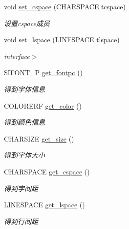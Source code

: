 \begin{DoxyCompactItemize}
void \hyperlink{class_s_i_c_h_a_r___i_n_f_o_a18aaf35f07094cb42942663a71456227}{set\+\_\+cspace} (C\+H\+A\+R\+S\+P\+A\+CE tcspace)
\begin{DoxyCompactList}\small\item\em 设置cspace成员 \end{DoxyCompactList}\item 
void \hyperlink{class_s_i_c_h_a_r___i_n_f_o_af38e1eac74e8d9c14e5c5d05d58f8b36}{set\+\_\+lspace} (L\+I\+N\+E\+S\+P\+A\+CE tlspace)
\begin{DoxyCompactList}\small\item\em interface$>$ \end{DoxyCompactList}\item 
S\+I\+F\+O\+N\+T\+\_\+P \hyperlink{class_s_i_c_h_a_r___i_n_f_o_ad53aa1c6641e81bf0b79f17836aa5dfa}{get\+\_\+fontpc} ()
\begin{DoxyCompactList}\small\item\em 得到字体信息~\newline
\end{DoxyCompactList}\item 
C\+O\+L\+O\+R\+E\+RF \hyperlink{class_s_i_c_h_a_r___i_n_f_o_acd6d47c6cf5f266e18033e45763d6272}{get\+\_\+color} ()
\begin{DoxyCompactList}\small\item\em 得到颜色信息~\newline
\end{DoxyCompactList}\item 
C\+H\+A\+R\+S\+I\+ZE \hyperlink{class_s_i_c_h_a_r___i_n_f_o_aae2cfbd0b6bbb122008da027f662291b}{get\+\_\+size} ()
\begin{DoxyCompactList}\small\item\em 得到字体大小~\newline
\end{DoxyCompactList}\item 
C\+H\+A\+R\+S\+P\+A\+CE \hyperlink{class_s_i_c_h_a_r___i_n_f_o_af170e524f63209016d06f919dd4c33d3}{get\+\_\+cspace} ()
\begin{DoxyCompactList}\small\item\em 得到字间距~\newline
\end{DoxyCompactList}\item 
L\+I\+N\+E\+S\+P\+A\+CE \hyperlink{class_s_i_c_h_a_r___i_n_f_o_a212cea0692a8717d5b671035885796c2}{get\+\_\+lspace} ()
\begin{DoxyCompactList}\small\item\em 得到行间距~\newline

\end{DoxyCompactList}
\end{DoxyCompactItemize}
